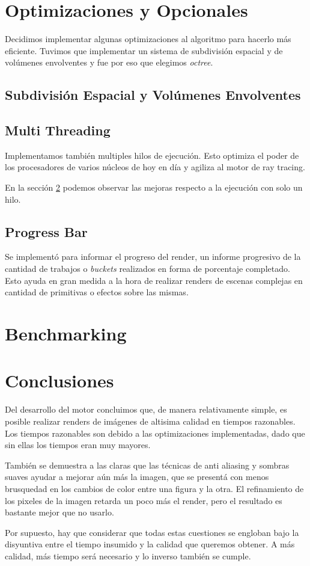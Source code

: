 \documentclass[a4paper,10pt]{article}
\begin{document}
\section{Optimizaciones y Opcionales}
Decidimos implementar algunas optimizaciones al algoritmo para hacerlo m\'as
eficiente.  Tuvimos que implementar un sistema de subdivisi\'on espacial y de
vol\'umenes envolventes y fue por eso que elegimos \emph{octree}.
\subsection{Subdivisi\'on Espacial y Vol\'umenes Envolventes}
\label{octree}


\subsection{Multi Threading}

Implementamos tambi\'en multiples hilos de ejecuci\'on.  Esto optimiza el poder
de los procesadores de varios n\'ucleos de hoy en d\'ia y agiliza al motor de
ray tracing.

En la secci\'on \ref{bench} podemos observar las mejoras respecto a la
ejecuci\'on con solo un hilo.

\subsection{Progress Bar}

Se implement\'o para informar el progreso del render, un informe progresivo de
la cantidad de trabajos o \emph{buckets} realizados en forma de porcentaje
completado. Esto ayuda en gran medida a la hora de realizar renders de escenas
complejas en cantidad de primitivas o efectos sobre las mismas.

\section{Benchmarking}
\label{bench}
\section{Conclusiones}
\label{conc}

Del desarrollo del motor concluimos que, de manera relativamente simple, es
posible realizar renders de im\'agenes de altisima calidad en tiempos
razonables.  Los tiempos razonables son debido a las optimizaciones
implementadas, dado que sin ellas los tiempos eran muy mayores.

Tambi\'en se demuestra a las claras que las t\'ecnicas de anti aliasing y
sombras suaves ayudar a mejorar a\'un m\'as la imagen, que se present\'a con
menos brusquedad en los cambios de color entre una figura y la otra.  El
refinamiento de los pixeles de la imagen retarda un poco m\'as el render, pero
el resultado es bastante mejor que no usarlo.

Por supuesto, hay que considerar que todas estas cuestiones se engloban bajo la
disyuntiva entre el tiempo insumido y la calidad que queremos obtener.  A m\'as
calidad, m\'as tiempo ser\'a necesario y lo inverso tambi\'en se cumple.
\end{document}
